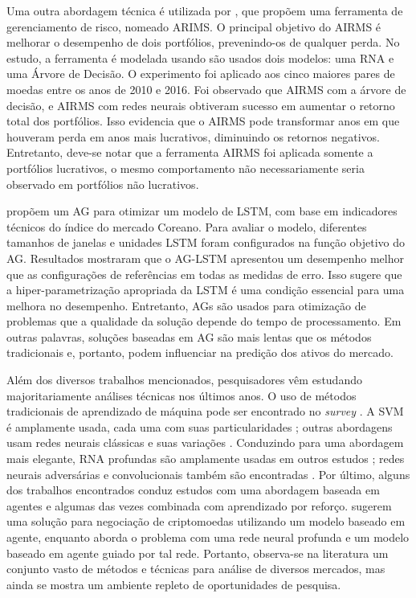 Uma outra abordagem técnica é utilizada por \textcite{airms}, que propõem uma ferramenta de gerenciamento de risco, nomeado ARIMS. O principal objetivo do AIRMS é melhorar o desempenho de dois portfólios, prevenindo-os de qualquer perda. No estudo, a ferramenta é modelada usando são usados dois modelos: uma \acrfull{RNA} e uma Árvore de Decisão. O experimento foi aplicado aos cinco maiores pares de moedas entre os anos de 2010 e 2016. Foi observado que AIRMS com a árvore de decisão, e AIRMS com redes neurais obtiveram sucesso em aumentar o retorno total dos portfólios. Isso evidencia que o AIRMS pode transformar anos em que houveram perda em anos mais lucrativos, diminuindo os retornos negativos. Entretanto, deve-se notar que a ferramenta AIRMS foi aplicada somente a portfólios lucrativos, o mesmo comportamento não necessariamente seria observado em portfólios não lucrativos.

\textcite{ga_optimized_lstm} propõem um \acrfull{AG} para otimizar um modelo de LSTM, com base em indicadores técnicos do índice do mercado Coreano. Para avaliar o modelo, diferentes tamanhos de janelas e unidades LSTM foram configurados na função objetivo do \acrshort{AG}. Resultados mostraram que o AG-LSTM apresentou um desempenho melhor que as configurações de referências em todas as medidas de erro. Isso sugere que a hiper-parametrização apropriada da LSTM é uma condição essencial para uma melhora no desempenho. Entretanto, \acrshort{AG}s são usados para otimização de problemas que a qualidade da solução depende do tempo de processamento. Em outras palavras, soluções baseadas em \acrshort{AG} são mais lentas que os métodos tradicionais e, portanto, podem influenciar na predição dos ativos do mercado.

Além dos diversos trabalhos mencionados, pesquisadores vêm estudando majoritariamente análises técnicas nos últimos anos. O uso de métodos tradicionais de aprendizado de máquina pode ser encontrado no \textit{survey} \cite{review}. A \acrshort{SVM} é amplamente usada, cada uma com suas particularidades \cite{predicting_direction_svm,  hybrid_forecasting, gabased_svm, clustering_svm}; outras abordagens usam redes neurais clássicas e suas variações \cite{forecasting_returns, nn_forecasting}. Conduzindo para uma abordagem mais elegante, \acrshort{RNA} profundas são amplamente usadas em outros estudos \cite{method_rep_studies, increase_decrease, classification_dnn, candlestick}; redes neurais adversárias e convolucionais também são encontradas \cite{adversarial_portifolio, convolutional_image}. Por último, alguns dos trabalhos encontrados conduz estudos com uma abordagem baseada em agentes e algumas das vezes combinada com aprendizado por reforço. \textcite{cryptocurrency} sugerem uma solução para negociação de criptomoedas utilizando um modelo baseado em agente, enquanto \textcite{ftgame} aborda o problema com uma rede neural profunda e um modelo baseado em agente guiado por tal rede. Portanto, observa-se na literatura um conjunto vasto de métodos e técnicas para análise de diversos mercados, mas ainda se mostra um ambiente repleto de oportunidades de pesquisa.

